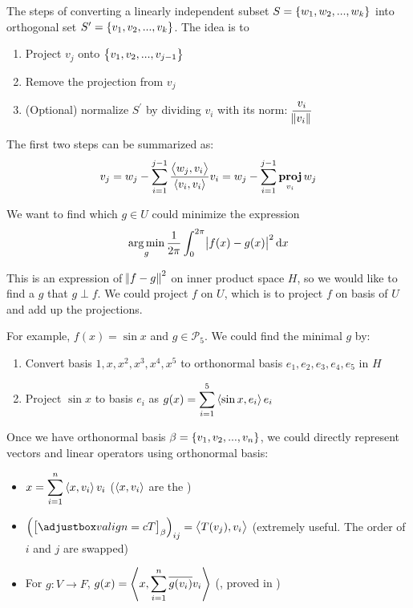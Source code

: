 \begin{theorem}\label{gram_schmidt_process}
    The steps of converting a linearly independent subset $S=\set{w_1, w_2, ..., w_k}$ into orthogonal set $S^\prime=\set{v_1, v_2, ..., v_k}$. The idea is to 
    \begin{enumerate}
        \item Project $v_{j}$ onto $\set{v_1, v_2, ..., v_{j-1}}$
        \item Remove the projection from $v_j$
        \item (Optional) normalize $S^\prime$ by dividing $v_i$ with its norm: $\displaystyle \frac{v_i}{\norm{v_i}}$
    \end{enumerate}
    
    The first two steps can be summarized as:
    \begin{equation}
        v_j = w_j - \sum_{i=1}^{j-1} \frac{\innerproduct{w_j}{v_i}}{\innerproduct{v_i}{v_i}} v_i = w_j - \sum_{i=1}^{j-1} \projection{w_j}{v_i}
    \end{equation}
\end{theorem}


\begin{example}
    We want to find which $g \in U$ could minimize the expression
    \begin{equation}
        \argmin{g} \frac{1}{2\pi}\int_{0}^{2\pi} \absolutevalue{f(x) - g(x)}^2 \dif x
    \end{equation}
    
     This is an expression of $\norm{f - g}^2$ on inner product space $H$, so we would like to find a $g$ that $g \perp f$. We could project $f$ on $U$, which is to project $f$ on basis of $U$ and add up the projections.
     
     For example, $f(x) = \sin{x}$ and $g \in \mathcal{P}_5$. We could find the minimal $g$ by:
     \begin{enumerate}
         \item Convert basis $1, x, x^2, x^3, x^4, x^5$ to orthonormal basis $e_1, e_2, e_3, e_4, e_5$ in $H$
         \item Project $\sin{x}$ to basis $e_i$ as $\displaystyle g(x) = \sum_{i=1}^5 \innerproduct{\sin{x}}{e_i}e_i$
     \end{enumerate}
\end{example}

Once we have orthonormal basis $\beta = \set{v_1, v_2, ..., v_n}$,  we could directly represent vectors and linear operators using orthonormal basis:
\begin{itemize}
    \item $\displaystyle x = \sum_{i=1}^n \innerproduct{x}{v_i} v_i$ ($\innerproduct{x}{v_i}$ are the )
    \item $\left(\coordinate{T}_\beta\right)_{ij} = \innerproduct{T(v_j)}{v_i}$ (extremely useful. The order of $i$ and $j$ are swapped)
    \item For $g: V \rightarrow F$, $g(x) = \innerproduct{x}{\sum_{i=1}^n \conjugate{g(v_i)} v_i}$ (, proved in )
\end{itemize}


